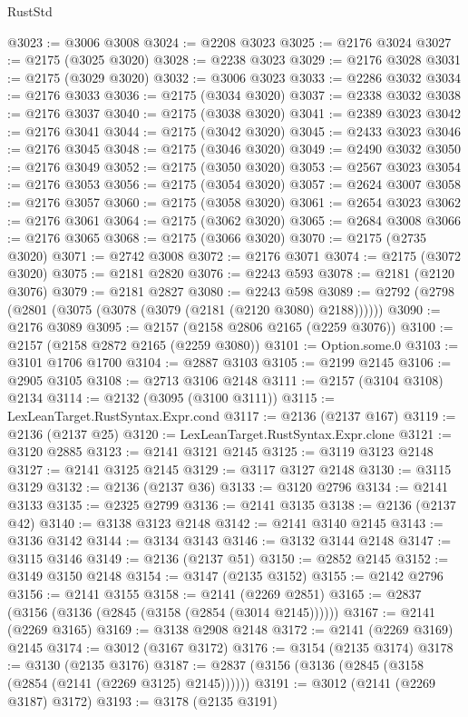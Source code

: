 \begin{lexlean}{RustStd}
\begin{coremodule}
@3023 := @3006 @3008
@3024 := @2208 @3023
@3025 := @2176 @3024
@3027 := @2175 (@3025 @3020)
@3028 := @2238 @3023
@3029 := @2176 @3028
@3031 := @2175 (@3029 @3020)
@3032 := @3006 @3023
@3033 := @2286 @3032
@3034 := @2176 @3033
@3036 := @2175 (@3034 @3020)
@3037 := @2338 @3032
@3038 := @2176 @3037
@3040 := @2175 (@3038 @3020)
@3041 := @2389 @3023
@3042 := @2176 @3041
@3044 := @2175 (@3042 @3020)
@3045 := @2433 @3023
@3046 := @2176 @3045
@3048 := @2175 (@3046 @3020)
@3049 := @2490 @3032
@3050 := @2176 @3049
@3052 := @2175 (@3050 @3020)
@3053 := @2567 @3023
@3054 := @2176 @3053
@3056 := @2175 (@3054 @3020)
@3057 := @2624 @3007
@3058 := @2176 @3057
@3060 := @2175 (@3058 @3020)
@3061 := @2654 @3023
@3062 := @2176 @3061
@3064 := @2175 (@3062 @3020)
@3065 := @2684 @3008
@3066 := @2176 @3065
@3068 := @2175 (@3066 @3020)
@3070 := @2175 (@2735 @3020)
@3071 := @2742 @3008
@3072 := @2176 @3071
@3074 := @2175 (@3072 @3020)
@3075 := @2181 @2820
@3076 := @2243 @593
@3078 := @2181 (@2120 @3076)
@3079 := @2181 @2827
@3080 := @2243 @598
@3089 := @2792 (@2798 (@2801 (@3075 (@3078 (@3079 (@2181 (@2120 @3080) @2188))))))
@3090 := @2176 @3089
@3095 := @2157 (@2158 @2806 @2165 (@2259 @3076))
@3100 := @2157 (@2158 @2872 @2165 (@2259 @3080))
@3101 := Option.some.{0}
@3103 := @3101 @1706 @1700
@3104 := @2887 @3103
@3105 := @2199 @2145
@3106 := @2905 @3105
@3108 := @2713 @3106 @2148
@3111 := @2157 (@3104 @3108) @2134
@3114 := @2132 (@3095 (@3100 @3111))
@3115 := LexLeanTarget.RustSyntax.Expr.cond
@3117 := @2136 (@2137 @167)
@3119 := @2136 (@2137 @25)
@3120 := LexLeanTarget.RustSyntax.Expr.clone
@3121 := @3120 @2885
@3123 := @2141 @3121 @2145
@3125 := @3119 @3123 @2148
@3127 := @2141 @3125 @2145
@3129 := @3117 @3127 @2148
@3130 := @3115 @3129
@3132 := @2136 (@2137 @36)
@3133 := @3120 @2796
@3134 := @2141 @3133
@3135 := @2325 @2799
@3136 := @2141 @3135
@3138 := @2136 (@2137 @42)
@3140 := @3138 @3123 @2148
@3142 := @2141 @3140 @2145
@3143 := @3136 @3142
@3144 := @3134 @3143
@3146 := @3132 @3144 @2148
@3147 := @3115 @3146
@3149 := @2136 (@2137 @51)
@3150 := @2852 @2145
@3152 := @3149 @3150 @2148
@3154 := @3147 (@2135 @3152)
@3155 := @2142 @2796
@3156 := @2141 @3155
@3158 := @2141 (@2269 @2851)
@3165 := @2837 (@3156 (@3136 (@2845 (@3158 (@2854 (@3014 @2145))))))
@3167 := @2141 (@2269 @3165)
@3169 := @3138 @2908 @2148
@3172 := @2141 (@2269 @3169) @2145
@3174 := @3012 (@3167 @3172)
@3176 := @3154 (@2135 @3174)
@3178 := @3130 (@2135 @3176)
@3187 := @2837 (@3156 (@3136 (@2845 (@3158 (@2854 (@2141 (@2269 @3125) @2145))))))
@3191 := @3012 (@2141 (@2269 @3187) @3172)
@3193 := @3178 (@2135 @3191)

\end{coremodule}
\end{lexlean}
